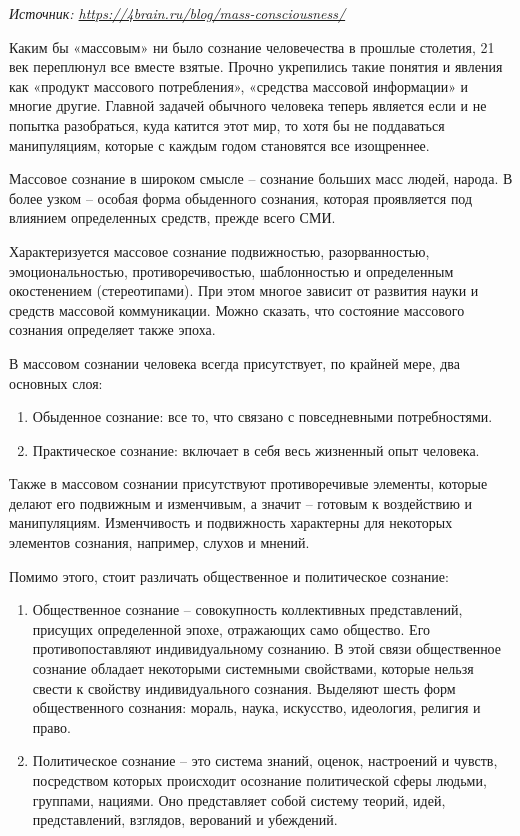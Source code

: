 \textit{Источник: \url{https://4brain.ru/blog/mass-consciousness/}}

Каким бы «массовым» ни было сознание человечества в прошлые столетия, 21 век переплюнул все вместе взятые. Прочно укрепились такие понятия и явления как «продукт массового потребления», «средства массовой информации» и многие другие. Главной задачей обычного человека теперь является если и не попытка разобраться, куда катится этот мир, то хотя бы не поддаваться манипуляциям, которые с каждым годом становятся все изощреннее.

Массовое сознание в широком смысле – сознание больших масс людей, народа. В более узком – особая форма обыденного сознания, которая проявляется под влиянием определенных средств, прежде всего СМИ.

Характеризуется массовое сознание подвижностью, разорванностью, эмоциональностью, противоречивостью, шаблонностью и определенным окостенением (стереотипами). При этом многое зависит от развития науки и средств массовой коммуникации. Можно сказать, что состояние массового сознания определяет также эпоха.

В массовом сознании человека всегда присутствует, по крайней мере, два основных слоя:

\begin{enumerate}
    \item Обыденное сознание: все то, что связано с повседневными потребностями.
    \item Практическое сознание: включает в себя весь жизненный опыт человека.
\end{enumerate}

Также в массовом сознании присутствуют противоречивые элементы, которые делают его подвижным и изменчивым, а значит – готовым к воздействию и манипуляциям. Изменчивость и подвижность характерны для некоторых элементов сознания, например, слухов и мнений.

Помимо этого, стоит различать общественное и политическое сознание:

\begin{enumerate}
    \item Общественное сознание – совокупность коллективных представлений, присущих определенной эпохе, отражающих само общество. Его противопоставляют индивидуальному сознанию. В этой связи общественное сознание обладает некоторыми системными свойствами, которые нельзя свести к свойству индивидуального сознания. Выделяют шесть форм общественного сознания: мораль, наука, искусство, идеология, религия и право.
    \item Политическое сознание – это система знаний, оценок, настроений и чувств, посредством которых происходит осознание политической сферы людьми, группами, нациями. Оно представляет собой систему теорий, идей, представлений, взглядов, верований и убеждений.
\end{enumerate}

